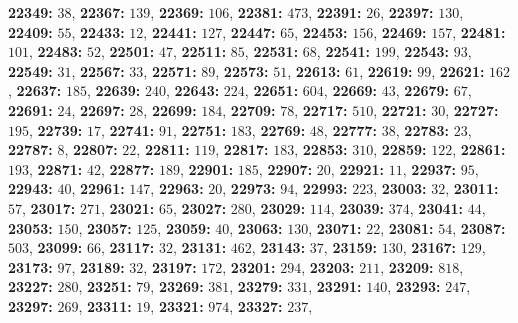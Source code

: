 \textsf{\bfseries 22349:} $38$, \textsf{\bfseries 22367:} $139$, \textsf{\bfseries 22369:} $106$, \textsf{\bfseries 22381:} $473$, \textsf{\bfseries 22391:} $26$, \textsf{\bfseries 22397:} $130$, \textsf{\bfseries 22409:} $55$, \textsf{\bfseries 22433:} $12$, \textsf{\bfseries 22441:} $127$, \textsf{\bfseries 22447:} $65$, \textsf{\bfseries 22453:} $156$, \textsf{\bfseries 22469:} $157$, \textsf{\bfseries 22481:} $101$, \textsf{\bfseries 22483:} $52$, \textsf{\bfseries 22501:} $47$, \textsf{\bfseries 22511:} $85$, \textsf{\bfseries 22531:} $68$, \textsf{\bfseries 22541:} $199$, \textsf{\bfseries 22543:} $93$, \textsf{\bfseries 22549:} $31$, \textsf{\bfseries 22567:} $33$, \textsf{\bfseries 22571:} $89$, \textsf{\bfseries 22573:} $51$, \textsf{\bfseries 22613:} $61$, \textsf{\bfseries 22619:} $99$, \textsf{\bfseries 22621:} $162$, \textsf{\bfseries 22637:} $185$, \textsf{\bfseries 22639:} $240$, \textsf{\bfseries 22643:} $224$, \textsf{\bfseries 22651:} $604$, \textsf{\bfseries 22669:} $43$, \textsf{\bfseries 22679:} $67$, \textsf{\bfseries 22691:} $24$, \textsf{\bfseries 22697:} $28$, \textsf{\bfseries 22699:} $184$, \textsf{\bfseries 22709:} $78$, \textsf{\bfseries 22717:} $510$, \textsf{\bfseries 22721:} $30$, \textsf{\bfseries 22727:} $195$, \textsf{\bfseries 22739:} $17$, \textsf{\bfseries 22741:} $91$, \textsf{\bfseries 22751:} $183$, \textsf{\bfseries 22769:} $48$, \textsf{\bfseries 22777:} $38$, \textsf{\bfseries 22783:} $23$, \textsf{\bfseries 22787:} $8$, \textsf{\bfseries 22807:} $22$, \textsf{\bfseries 22811:} $119$, \textsf{\bfseries 22817:} $183$, \textsf{\bfseries 22853:} $310$, \textsf{\bfseries 22859:} $122$, \textsf{\bfseries 22861:} $193$, \textsf{\bfseries 22871:} $42$, \textsf{\bfseries 22877:} $189$, \textsf{\bfseries 22901:} $185$, \textsf{\bfseries 22907:} $20$, \textsf{\bfseries 22921:} $11$, \textsf{\bfseries 22937:} $95$, \textsf{\bfseries 22943:} $40$, \textsf{\bfseries 22961:} $147$, \textsf{\bfseries 22963:} $20$, \textsf{\bfseries 22973:} $94$, \textsf{\bfseries 22993:} $223$, \textsf{\bfseries 23003:} $32$, \textsf{\bfseries 23011:} $57$, \textsf{\bfseries 23017:} $271$, \textsf{\bfseries 23021:} $65$, \textsf{\bfseries 23027:} $280$, \textsf{\bfseries 23029:} $114$, \textsf{\bfseries 23039:} $374$, \textsf{\bfseries 23041:} $44$, \textsf{\bfseries 23053:} $150$, \textsf{\bfseries 23057:} $125$, \textsf{\bfseries 23059:} $40$, \textsf{\bfseries 23063:} $130$, \textsf{\bfseries 23071:} $22$, \textsf{\bfseries 23081:} $54$, \textsf{\bfseries 23087:} $503$, \textsf{\bfseries 23099:} $66$, \textsf{\bfseries 23117:} $32$, \textsf{\bfseries 23131:} $462$, \textsf{\bfseries 23143:} $37$, \textsf{\bfseries 23159:} $130$, \textsf{\bfseries 23167:} $129$, \textsf{\bfseries 23173:} $97$, \textsf{\bfseries 23189:} $32$, \textsf{\bfseries 23197:} $172$, \textsf{\bfseries 23201:} $294$, \textsf{\bfseries 23203:} $211$, \textsf{\bfseries 23209:} $818$, \textsf{\bfseries 23227:} $280$, \textsf{\bfseries 23251:} $79$, \textsf{\bfseries 23269:} $381$, \textsf{\bfseries 23279:} $331$, \textsf{\bfseries 23291:} $140$, \textsf{\bfseries 23293:} $247$, \textsf{\bfseries 23297:} $269$, \textsf{\bfseries 23311:} $19$, \textsf{\bfseries 23321:} $974$, \textsf{\bfseries 23327:} $237$, 
